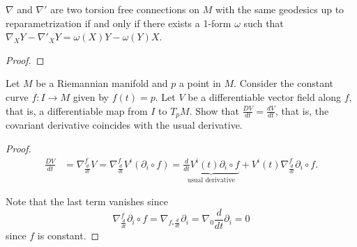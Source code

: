 \documentclass{book}
\begin{document}
\begin{exercise}
\label{exercise-two-torsion-free-connections}
$\nabla$ and $\nabla'$ are two torsion
free connections on $M$ with the same
geodesics up to reparametrization
if and only if there exists a 1-form
$\omega$ such that
$\nabla_XY-\nabla'_XY
=\omega(X)Y-\omega(Y)X$.
\end{exercise}

\begin{proof}

\end{proof}

\begin{exercise}
\label{exercise-constant-curve-connection}
Let $M$ be a Riemannian manifold and $p$ a
point in $M$. Consider the constant curve
$f:I \to M$ given by $f(t)=p$. Let $V$ be a
differentiable vector field along $f$, that
is, a differentiable map from $I$ to $T_pM$.
Show that $\frac{DV}{dt}=\frac{dV}{dt}$, that
is, the covariant derivative coincides with
the usual derivative.
\end{exercise}

\begin{proof}
$$
\begin{aligned}
\frac{DV}{dt}&=\nabla^f_{\frac{d}{dt}}V
=\nabla^f_{\frac{d}{dt}}V^i(\partial_i\circ
f)
=\underbrace{\frac{d}{dt}V^i(t)
\partial_i\circ
f}_{\text{usual derivative}}
+V^i(t)\nabla_{\frac{d}{dt}}^f\partial_i
\circ f.
\end{aligned}
$$

\noindent
Note that the last term vanishes since
$$
\nabla^f_{\frac{d}{dt}}\partial_i \circ f
= \nabla_{f_*\frac{d}{dt}}\partial_i
=\nabla_0\frac{d}{dt}\partial_i=0
$$
since $f$ is constant.
\end{proof}
\end{document}

